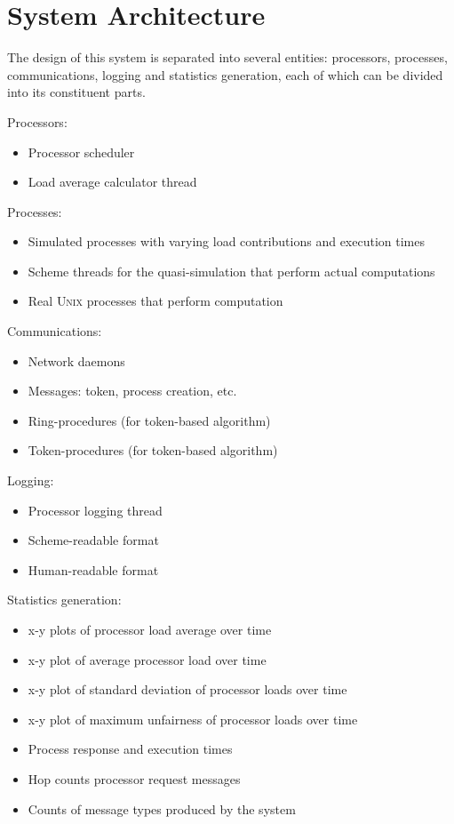 \documentclass{report}
\newcommand{\UNIX}{\textsc{Unix}\xspace}
\begin{document}
\section{System Architecture}

The design of this system is separated into several entities: processors,
processes, communications, logging and statistics generation, each of which
can be divided into its constituent parts.

Processors:
\begin{itemize} 
	\item Processor scheduler
	\item Load average calculator thread
\end{itemize}

Processes:
\begin{itemize}
	\item Simulated processes with varying load contributions and
	execution times
	\item Scheme threads for the quasi-simulation that perform actual
	computations 
	\item Real \UNIX processes that perform computation
\end{itemize}


Communications:
\begin{itemize}
	\item Network daemons
	\item Messages: token, process creation, etc.
	\item Ring-procedures (for token-based algorithm)
	\item Token-procedures (for token-based algorithm)
\end{itemize}


Logging:
\begin{itemize}
	\item Processor logging thread
	\item Scheme-readable format
	\item Human-readable format
\end{itemize}

Statistics generation:
\begin{itemize}
	\item x-y plots of processor load average over time
	\item x-y plot of average processor load over time
	\item x-y plot of standard deviation of processor loads over time
	\item x-y plot of maximum unfairness of processor loads over time
	\item Process response and execution times
	\item Hop counts processor request messages
	\item Counts of message types produced by the system
\end{itemize}
\end{document}
